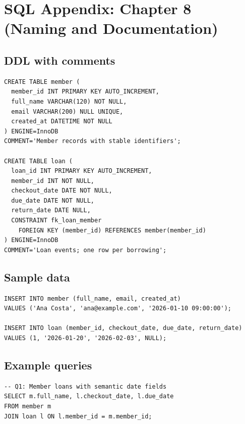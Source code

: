 \chapter{SQL Appendix: Chapter 8 (Naming and Documentation)}

\section{DDL with comments}
\begin{verbatim}
CREATE TABLE member (
  member_id INT PRIMARY KEY AUTO_INCREMENT,
  full_name VARCHAR(120) NOT NULL,
  email VARCHAR(200) NULL UNIQUE,
  created_at DATETIME NOT NULL
) ENGINE=InnoDB
COMMENT='Member records with stable identifiers';

CREATE TABLE loan (
  loan_id INT PRIMARY KEY AUTO_INCREMENT,
  member_id INT NOT NULL,
  checkout_date DATE NOT NULL,
  due_date DATE NOT NULL,
  return_date DATE NULL,
  CONSTRAINT fk_loan_member
    FOREIGN KEY (member_id) REFERENCES member(member_id)
) ENGINE=InnoDB
COMMENT='Loan events; one row per borrowing';
\end{verbatim}

\section{Sample data}
\begin{verbatim}
INSERT INTO member (full_name, email, created_at)
VALUES ('Ana Costa', 'ana@example.com', '2026-01-10 09:00:00');

INSERT INTO loan (member_id, checkout_date, due_date, return_date)
VALUES (1, '2026-01-20', '2026-02-03', NULL);
\end{verbatim}

\section{Example queries}
\begin{verbatim}
-- Q1: Member loans with semantic date fields
SELECT m.full_name, l.checkout_date, l.due_date
FROM member m
JOIN loan l ON l.member_id = m.member_id;
\end{verbatim}
